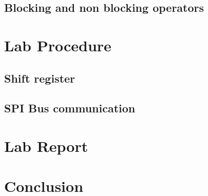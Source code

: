   \subsection{Blocking and non blocking operators}

\section{\bfseries Lab Procedure}

  \subsection{Shift register}

  \subsection{SPI Bus communication}
    
\section{\bfseries  Lab Report}
  
\section{\bfseries  Conclusion}
 

%

